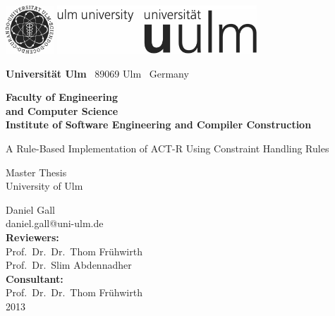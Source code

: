 \documentclass[
    a4paper,
    10pt,
    bibliography=totoc,
    twoside,
    openright,
    numbers=noenddot,
    headings=normal,
    DIV=9,
    BCOR=7mm
    ,parskip
]{scrbook}
\makeatletter
\newcommand{\fullname}{Daniel Gall}
\newcommand{\email}{daniel.gall@uni-ulm.de}
\newcommand{\titel}{A Rule-Based Implementation of ACT-R Using Constraint Handling Rules}
\newcommand{\jahr}{2013}
\newcommand{\gutachterA}{Prof.\ Dr.\ Dr.\ Thom Frühwirth}
\newcommand{\gutachterB}{Prof.\ Dr.\ Slim Abdennadher}
\newcommand{\betreuer}{Prof.\ Dr.\ Dr.\ Thom Frühwirth}
\newcommand{\fakultaet}{Engineering\\and Computer Science}
\newcommand{\institut}{Institute of Software Engineering and Compiler Construction}
\newcommand{\arbeit}{Master Thesis}
\makeatother
\begin{document}
\frontmatter


\thispagestyle{empty}
\begin{addmargin*}[4mm]{-32mm}
    \includegraphics[height=1.8cm]{images/unilogo_bild}
    \hfill
    \includegraphics[height=1.8cm]{images/unilogo_wort}
    \vspace*{2.1em}

    \footnotesize
    \textbf{Universität Ulm} \textbar ~89069 Ulm \textbar ~Germany
    \hfill
    \parbox[t]{42mm}{\bfseries Faculty of \fakultaet\\\mdseries\institut}
    \vspace*{2cm}

    \parbox{140mm}{\bfseries \raggedright \huge \titel}

    {\arbeit{}\\University of Ulm}
    \vspace*{4em}

    \fullname\\\email\\[2em]
    \textbf{Reviewers:}\\\gutachterA\\\gutachterB\\[2em]
    \textbf{Consultant:}\\\betreuer\\[1.5em]
    \jahr
\end{addmargin*}
\end{document}
